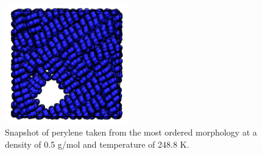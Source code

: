 \begin{figure}
  \begin{center}
    \includegraphics[width=0.48\textwidth]{src/figures/FF_figs/per_snapshot.png}
  \end{center}
  \caption{Snapshot of perylene taken from the most ordered morphology at a density of 0.5 g/mol and temperature of 248.8 K.}
  \label{Per_snapshot}
\end{figure}

